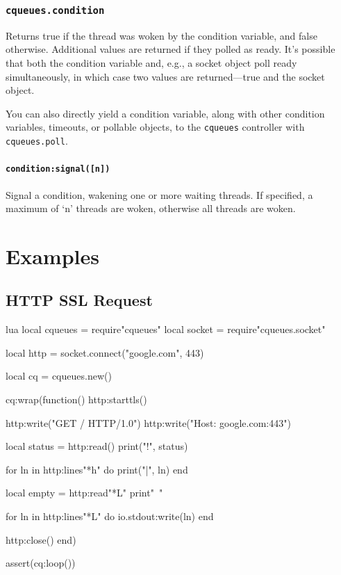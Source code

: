 \documentclass[11pt, oneside]{memoir}
\newcommand*{\cqueues}[0]{\texttt{cqueues}\xspace}
\newcommand*{\fn}[1]{\texttt{#1}\xspace}
\newcounter{toccols}
\newenvironment{Module}[1]{
	\subsection{\texttt{#1}}
	\addtocontents{toc}{
		\protect\begin{multicols}{\value{toccols}}
	}
}{
	\addtocontents{toc}{\protect\end{multicols}}
}
\begin{document}
\begin{Module}{cqueues.condition}
Returns true if the thread was woken by the condition variable, and false otherwise. Additional values are returned if they polled as ready. It's possible that both the condition variable and, e.g., a socket object poll ready simultaneously, in which case two values are returned---true and the socket object.

You can also directly yield a condition variable, along with other condition variables, timeouts, or pollable objects, to the \cqueues controller with \fn{cqueues.poll}.

\subsubsection[\fn{condition:signal}]{\fn{condition:signal([n])}}

Signal a condition, wakening one or more waiting threads. If specified, a maximum of `n' threads are woken, otherwise all threads are woken.

\end{Module}


\chapter{Examples}

\section{HTTP SSL Request}

\begin{example}{lua}
local cqueues = require"cqueues"
local socket = require"cqueues.socket"

local http = socket.connect("google.com", 443)

local cq = cqueues.new()

cq:wrap(function()
	http:starttls()

	http:write("GET / HTTP/1.0\n")
	http:write("Host: google.com:443\n\n")

	local status = http:read()
	print("!", status)

	for ln in http:lines"*h" do
		print("|", ln)
	end

	local empty = http:read"*L"
	print"~"

	for ln in http:lines"*L" do
		io.stdout:write(ln)
	end

	http:close()
end)

assert(cq:loop())
\end{example}
\end{document}
